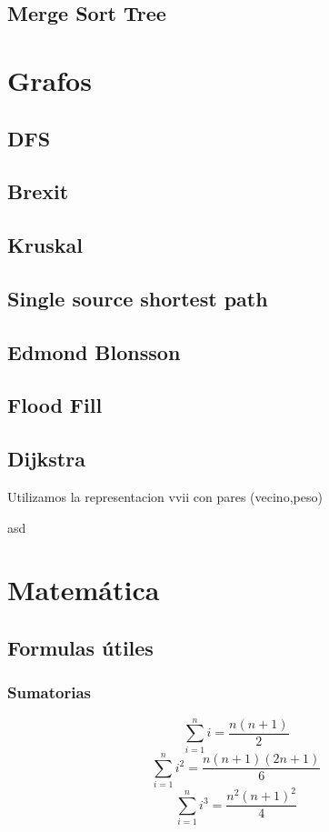 \documentclass[oneside]{book}
\begin{document}
		\section{Merge Sort Tree}
		
		
			

	
	\chapter{Grafos}
	
	\section{DFS}
	
	\section{Brexit}
	
	\section{Kruskal}
	
	\section{Single source shortest path}
	\section{Edmond Blonsson}
	
	\section{Flood Fill}
	
	\section{Dijkstra}
	Utilizamos la representacion vvii con pares (vecino,peso)
	\begin{codigo}
	asd
	\end{codigo}
	\chapter{Matem\'atica}
	\section{Formulas \'utiles}
	\subsection{Sumatorias}
		\[\sum_{i=1}^{n}i=\frac{n(n+1)}{2}\]
		\[\sum_{i=1}^{n}i^2=\frac{n(n+1)(2n+1)}{6}\]
		\[\sum_{i=1}^{n}i^3=\frac{n^2(n+1)^2}{4}\]
\end{document}
